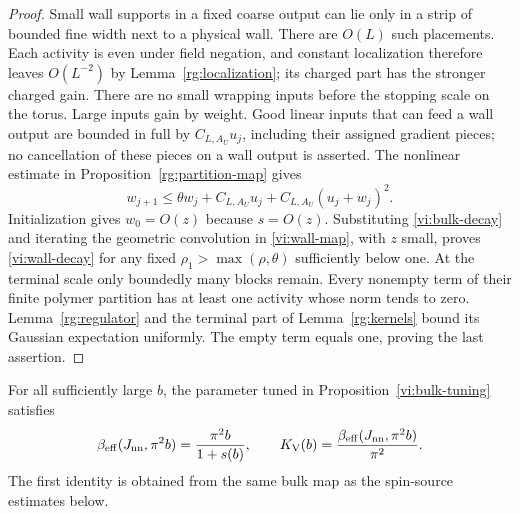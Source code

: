 \begin{proof}
Small wall supports in a fixed coarse output can lie only in a strip of
bounded fine width next to a physical wall.  There are $O(L)$ such
placements.  Each activity is even under field negation, and constant
localization therefore leaves $O(L^{-2})$ by
Lemma~\ref{rg:localization}; its charged part has the stronger charged
gain.  There are no small wrapping inputs before the stopping scale on
the torus.  Large inputs gain by weight.  Good linear inputs that can
feed a wall output are bounded in full by $C_{L,A_U}u_j$, including their
assigned gradient pieces; no cancellation of these pieces on a wall
output is asserted.  The nonlinear estimate in
Proposition~\ref{rg:partition-map} gives
\begin{equation}
 w_{j+1}\le\theta w_j+C_{L,A_U}u_j+
                   C_{L,A_U}(u_j+w_j)^2.                \label{vi:wall-map}
\end{equation}
Initialization gives $w_0=O(z)$ because $s=O(z)$.  Substituting
\eqref{vi:bulk-decay} and iterating the geometric convolution in
\eqref{vi:wall-map}, with $z$ small, proves \eqref{vi:wall-decay} for
any fixed $\rho_1>\max(\rho,\theta)$ sufficiently below one.
At the terminal scale only boundedly many blocks remain.  Every nonempty
term of their finite polymer partition has at least one activity whose
norm tends to zero.  Lemma~\ref{rg:regulator} and the terminal part of
Lemma~\ref{rg:kernels} bound its Gaussian expectation uniformly.  The
empty term equals one, proving the last assertion.
\end{proof}

\begin{proposition}
\label{vi:height-bridge}
For all sufficiently large $b$, the parameter tuned in
Proposition~\ref{vi:bulk-tuning} satisfies
\begin{equation}
 \beta_{\mathrm{eff}}(J_{\mathrm{nn}},\pi^2b)=\frac{\pi^2b}{1+s(b)},\qquad
 K_{\mathrm V}(b)=\frac{\beta_{\mathrm{eff}}(J_{\mathrm{nn}},\pi^2b)}{\pi^2}.
 \label{vi:effective-bridge}
\end{equation}
The first identity is obtained from the same bulk map as the spin-source
estimates below.
\end{proposition}

